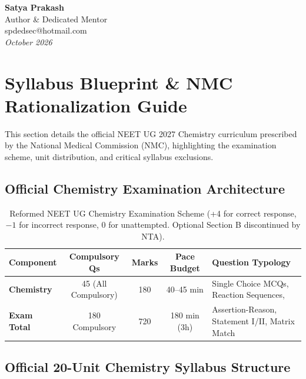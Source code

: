 \documentclass[10pt,twoside,openright]{book}
\begin{document}
\vspace{1cm}
\begin{flushright}
  \textbf{Satya Prakash}\\
  Author \& Dedicated Mentor\\
  spdedsec@hotmail.com\\
  \textit{October 2026}
\end{flushright}
\cleardoublepage

\chapter*{Syllabus Blueprint \& NMC Rationalization Guide}

This section details the official NEET UG 2027 Chemistry curriculum prescribed by the National Medical Commission (NMC), highlighting the examination scheme, unit distribution, and critical syllabus exclusions.

\section*{Official Chemistry Examination Architecture}

\begin{table}[htbp]
\centering
\footnotesize
\setlength{\tabcolsep}{3.5pt}
\renewcommand{\arraystretch}{1.2}
\begin{tabularx}{\textwidth}{l c c c Y}
\toprule
\textbf{Component} & \textbf{Compulsory Qs} & \textbf{Marks} & \textbf{Pace Budget} & \textbf{Question Typology} \\
\midrule
\textbf{Chemistry} & 45 (All Compulsory) & 180 & 40--45 min & Single Choice MCQs, Reaction Sequences, \\
\textbf{Exam Total} & 180 Compulsory & 720 & 180 min (3h) & Assertion-Reason, Statement I/II, Matrix Match \\
\bottomrule
\end{tabularx}
\caption{Reformed NEET UG Chemistry Examination Scheme (+4 for correct response, $-1$ for incorrect response, 0 for unattempted. Optional Section B discontinued by NTA).}
\end{table}

\section*{Official 20-Unit Chemistry Syllabus Structure}
\end{document}
